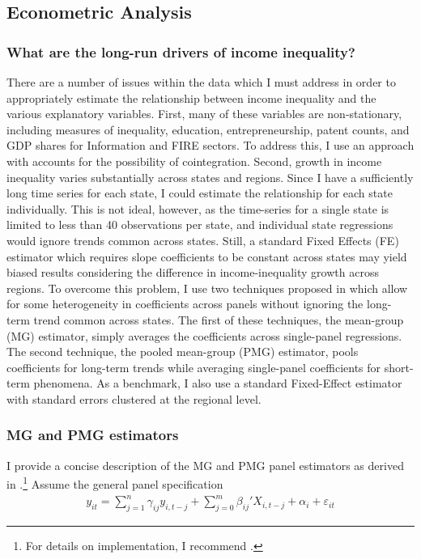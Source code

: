 \documentclass[11pt]{article}
\theoremstyle{definition}
\numberwithin{equation}{section}
\begin{document}
\subsection{Econometric Analysis}

\subsubsection{What are the long-run drivers of income inequality?}
There are a number of issues within the data which I must address in order to appropriately estimate the relationship between income inequality and the various explanatory variables.  First, many of these variables are non-stationary, including measures of inequality, education, entrepreneurship, patent counts, and GDP shares for Information and FIRE sectors. To address this, I use an approach with accounts for the possibility of cointegration.  Second, growth in income inequality varies substantially across states and regions. Since I have a sufficiently long time series for each state, I could estimate the relationship for each state individually. This is not ideal, however, as the time-series for a single state is limited to less than 40 observations per state, and individual state regressions would ignore trends common across states. Still, a standard Fixed Effects (FE) estimator which requires slope coefficients to be constant across states may yield biased results considering the difference in income-inequality growth across regions. To overcome this problem, I use two techniques proposed in \cite{pesaran1997pooled,pesaran1999pooled} which allow for some heterogeneity in coefficients across panels without ignoring the long-term trend common across states. The first of these techniques, the mean-group (MG) estimator, simply averages the coefficients across single-panel regressions. The second technique, the pooled mean-group (PMG) estimator, pools coefficients for long-term trends while averaging single-panel coefficients for short-term phenomena. As a benchmark, I also use a standard Fixed-Effect estimator with standard errors clustered at the regional level.

\subsubsection{MG and PMG estimators}
I provide a concise description of the MG and PMG panel estimators as derived in \cite{pesaran1997pooled,pesaran1999pooled}.\footnote{For details on implementation, I recommend \cite{blackburne2007estimation}. } Assume the general panel specification 
\begin{eqnarray}\label{eq:mg_est_setup}
y_{it} = \sum_{j=1}^n \gamma_{ij} y_{i,t-j} + \sum_{j=0}^m \beta_{ij}' X_{i,t-j} + \alpha_i +\varepsilon_{it}
\end{eqnarray}
\end{document}
